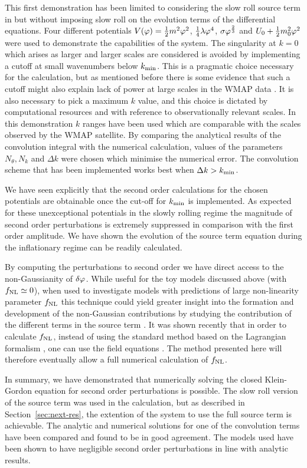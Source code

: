 This first demonstration has been limited to considering
the slow roll source term in  but without imposing
slow roll on the evolution terms of the differential equations. Four different
potentials
$V(\varphi)=\frac{1}{2} m^2 \varphi^2$, $\frac{1}{4}\lambda\varphi^4$, $\sigma\varphi^{\frac{2}{3}}$ and $U_0 + \frac{1}{2} m_0^2 \varphi^2$ were
used to demonstrate the capabilities of the
system. The singularity at $k=0$ which arises as larger and larger
scales are considered is avoided by implementing a cutoff at small
wavenumbers below $k_{\mathrm{min}}$. This is a pragmatic choice necessary for
the calculation, but as mentioned before there is some evidence that
such a cutoff might also explain lack of power at large scales in the
WMAP data \cite{spergel, Sinha:2005mn, Kim:2009pf}. It is also necessary to
pick a maximum $k$ value, and this choice is dictated by computational
resources and with reference to observationally relevant scales. In
this demonstration $k$ ranges have been used which are comparable with the
scales observed by the WMAP satellite. By comparing the analytical results of the
convolution integral with the numerical calculation, values of the parameters
$N_\theta, N_k$ and $\Delta k$ were chosen which minimise
the numerical error. The convolution scheme that has been implemented
works best when $\Delta k>k_{\mathrm{min}}$.


We have seen explicitly that the second order calculations for the chosen
potentials are obtainable once the cut-off for $k_{\mathrm{min}}$ is
implemented. As expected for these unexceptional potentials in the slowly
rolling regime the magnitude of second order perturbations is extremely
suppressed in comparison with the first order amplitude. We have shown the
evolution of the source term equation during the inflationary regime can be
readily calculated.


By computing the perturbations to second order we have direct access
to the non-Gaussianity of $\delta\varphi_{}$.  While useful for the toy models
discussed above (with $f_{\mathrm{NL}}\simeq0$), when used to investigate models
with predictions of large non-linearity parameter $f_{\mathrm{NL}}$ this technique
could yield greater insight into the formation and development of the
non-Gaussian contributions by studying the contribution of the different
terms in the source term .
%
It was shown recently that in order to calculate $f_{\mathrm{NL}}$, instead of
using the standard method based on the Lagrangian formalism
\cite{Maldacena:2002vr}, one can use the field equations
\cite{Musso:2006pt,Seery:2008qj}. The method presented here will
therefore eventually allow a full numerical calculation of $f_{\mathrm{NL}}$.


In summary, we have demonstrated that numerically solving the closed
Klein-Gordon equation for second order perturbations is possible. The slow roll
version of the source term was used in the calculation, but
as described in Section~\ref{sec:next-res}, the extention of the system to use
the full source term is achievable. 
The analytic and numerical solutions for one of the convolution terms have been
compared and found to be in good agreement.
The models used have been shown to have negligible second order
perturbations in line with analytic results. 
